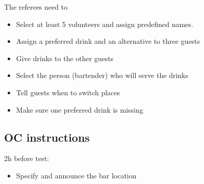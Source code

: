 The referees need to
\begin{itemize}
	\item Select at least 5 volunteers and assign predefined names. 
	\item Assign a preferred drink and an alternative to three guests
	\item Give drinks to the other guests
	\item Select the person (bartender) who will serve the drinks
	\item Tell guests when to switch places
	\item Make sure one preferred drink is missing
\end{itemize}

\subsection{OC instructions}

2h before test:
\begin{itemize}
	\item Specify and announce the bar location
\end{itemize}

% 
